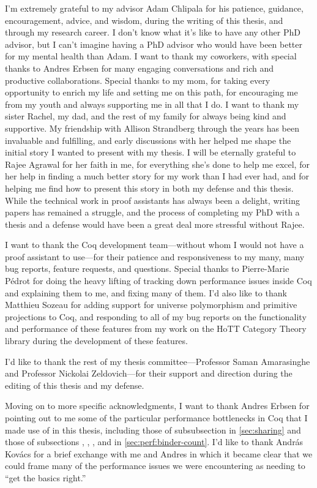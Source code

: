 I'm extremely grateful to my advisor Adam Chlipala for his patience, guidance, encouragement, advice, and wisdom, during the writing of this thesis, and through my research career.
I don't know what it's like to have any other PhD advisor, but I can't imagine having a PhD advisor who would have been better for my mental health than Adam.
I want to thank my coworkers, with special thanks to Andres Erbsen for many engaging conversations and rich and productive collaborations.
Special thanks to my mom, for taking every opportunity to enrich my life and setting me on this path, for encouraging me from my youth and always supporting me in all that I do.
I want to thank my sister Rachel, my dad, and the rest of my family for always being kind and supportive.
My friendship with Allison Strandberg through the years has been invaluable and fulfilling, and early discussions with her helped me shape the initial story I wanted to present with my thesis.
I will be eternally grateful to Rajee Agrawal for her faith in me, for everything she's done to help me excel, for her help in finding a much better story for my work than I had ever had, and for helping me find how to present this story in both my defense and this thesis.
While the technical work in proof assistants has always been a delight, writing papers has remained a struggle, and the process of completing my PhD with a thesis and a defense would have been a great deal more stressful without Rajee.

I want to thank the Coq development team---without whom I would not have a proof assistant to use---for their patience and responsiveness to my many, many bug reports, feature requests, and questions.
Special thanks to Pierre-Marie Pédrot for doing the heavy lifting of tracking down performance issues inside Coq and explaining them to me, and fixing many of them.
I'd also like to thank Matthieu Sozeau for adding support for universe polymorphism and primitive projections to Coq, and responding to all of my bug reports on the functionality and performance of these features from my work on the HoTT Category Theory library during the development of these features.

I'd like to thank the rest of my thesis committee---Professor Saman Amarasinghe and Professor Nickolai Zeldovich---for their support and direction during the editing of this thesis and my defense.

Moving on to more specific acknowledgments, I want to thank Andres Erbsen for pointing out to me some of the particular performance bottlenecks in Coq that I made use of in this thesis, including those of subsubsection  in \autoref{sec:sharing} and those of subsections , , , and  in \autoref{sec:perf:binder-count}.
I'd like to thank András Kovács for a brief exchange with me and Andres in which it became clear that we could frame many of the performance issues we were encountering as needing to ``get the basics right.''

